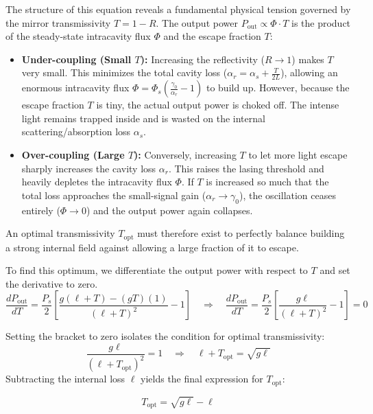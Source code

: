 The structure of this equation reveals a fundamental physical tension governed by the mirror transmissivity $T = 1 - R$. The output power $P_{\text{out}} \propto \Phi \cdot T$ is the product of the steady-state intracavity flux $\Phi$ and the escape fraction $T$:
\begin{itemize}
    \item \textbf{Under-coupling (Small $T$):} Increasing the reflectivity ($R \to 1$) makes $T$ very small. This minimizes the total cavity loss ($\alpha_r = \alpha_s + \frac{T}{2L}$), allowing an enormous intracavity flux $\Phi = \Phi_s\left(\frac{\gamma_0}{\alpha_r} - 1\right)$ to build up. However, because the escape fraction $T$ is tiny, the actual output power is choked off. The intense light remains trapped inside and is wasted on the internal scattering/absorption loss $\alpha_s$.
    \item \textbf{Over-coupling (Large $T$):} Conversely, increasing $T$ to let more light escape sharply increases the cavity loss $\alpha_r$. This raises the lasing threshold and heavily depletes the intracavity flux $\Phi$. If $T$ is increased so much that the total loss approaches the small-signal gain ($\alpha_r \to \gamma_0$), the oscillation ceases entirely ($\Phi \to 0$) and the output power again collapses.
\end{itemize}
An optimal transmissivity $T_{\text{opt}}$ must therefore exist to perfectly balance building a strong internal field against allowing a large fraction of it to escape.

To find this optimum, we differentiate the output power with respect to $T$ and set the derivative to zero.
\begin{equation*}
    \frac{dP_{\text{out}}}{dT} = \frac{P_s}{2} \left[ \frac{g(\ell + T) - (gT)(1)}{(\ell + T)^2} - 1 \right] \quad \Rightarrow \quad \frac{dP_{\text{out}}}{dT} = \frac{P_s}{2} \left[ \frac{g\ell}{(\ell + T)^2} - 1 \right] = 0
\end{equation*}

Setting the bracket to zero isolates the condition for optimal transmissivity:
\begin{equation*}
    \frac{g\ell}{(\ell + T_{\text{opt}})^2} = 1 \quad \Rightarrow \quad \ell + T_{\text{opt}} = \sqrt{g\ell}
\end{equation*}
Subtracting the internal loss $\ell$ yields the final expression for $T_{\text{opt}}$:
\begin{keyresult}
    \begin{equation}
        T_{\text{opt}} = \sqrt{g\ell} - \ell
    \end{equation}
\end{keyresult}

